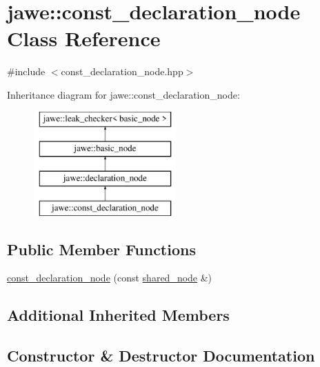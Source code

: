 \hypertarget{classjawe_1_1const__declaration__node}{}\section{jawe\+:\+:const\+\_\+declaration\+\_\+node Class Reference}
\label{classjawe_1_1const__declaration__node}


{\ttfamily \#include $<$const\+\_\+declaration\+\_\+node.\+hpp$>$}

Inheritance diagram for jawe\+:\+:const\+\_\+declaration\+\_\+node\+:\begin{figure}[H]
\begin{center}
\leavevmode
\includegraphics[height=4.000000cm]{classjawe_1_1const__declaration__node}
\end{center}
\end{figure}
\subsection*{Public Member Functions}
\begin{DoxyCompactItemize}
\item 
\hyperlink{classjawe_1_1const__declaration__node_ad31402f724923bf620197ccb175d78f0}{const\+\_\+declaration\+\_\+node} (const \hyperlink{namespacejawe_a3f307481d921b6cbb50cc8511fc2b544}{shared\+\_\+node} \&)
\end{DoxyCompactItemize}
\subsection*{Additional Inherited Members}


\subsection{Constructor \& Destructor Documentation}
\mbox{\label{classjawe_1_1const__declaration__node_ad31402f724923bf620197ccb175d78f0}} 
